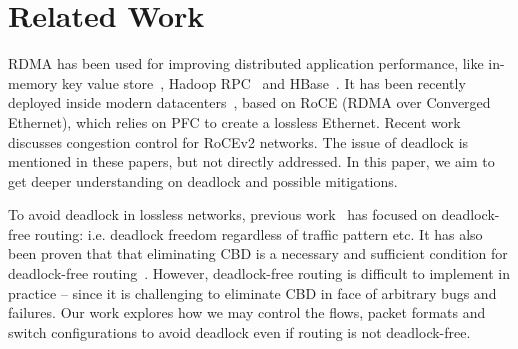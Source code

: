 \secspacelarge
\section{Related Work}
\secspace

 RDMA has been used for improving distributed
application performance, like in-memory key value store~\cite{mitchell13atc,
farm, kalia14sigcomm}, Hadoop RPC~\cite{hadooprdma} and HBase~\cite{hbaserdma}.
It has been recently deployed inside modern
datacenters~\cite{timely,dcqcn,rdmascale}, based on RoCE (RDMA over Converged
Ethernet), which relies on PFC to create a lossless Ethernet.  Recent
work~\cite{timely,dcqcn} discusses congestion control for RoCEv2
networks. The issue of deadlock is mentioned in these papers, but not directly
addressed. In this paper, we aim to get deeper understanding on deadlock and
possible mitigations.

 To avoid deadlock in lossless networks, previous
work~\cite{tcpbolt,karol2003prevention,lash,sancho2004,wu2003fault} has focused
on deadlock-free routing: i.e. deadlock freedom regardless of traffic pattern
etc. It has also been proven that that eliminating CBD is a
necessary and sufficient condition for deadlock-free
routing~\cite{deadlockfree}. However, deadlock-free routing is difficult to
implement in practice -- since it is challenging to eliminate CBD in face of 
arbitrary bugs and failures. Our work explores how we may
control the flows, packet formats and switch configurations to avoid deadlock
even if routing is not deadlock-free.






